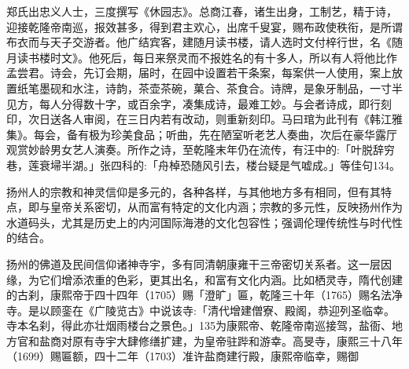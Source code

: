 \vfill
\begin{BookNotes}
\end{BookNotes}

\noindent 郑氏出忠义人士，三度撰写《休园志》。总商江春，诸生出身，工制艺，精于诗，迎接乾隆帝南巡，报效甚多，得到君主欢心，出席千叟宴，赐布政使秩衔，是所谓布衣而与天子交游者。他广结宾客，建随月读书楼，请人选时文付梓行世，名《随月读书楼时文》。他死后，每日来祭灵而不报姓名的有十多人，所以有人将他比作孟尝君。诗会，先订会期，届时，在园中设置若干条案，每案供一人使用，案上放置纸笔墨砚和水注，诗韵，茶壶茶碗，菓合、茶食合。诗牌，是象牙制品，一寸半见方，每人分得数十字，或百余字，凑集成诗，最难工妙。与会者诗成，即行刻印，次日送各人审阅，在三日内若有改动，则重新刻印。马曰琯为此刊有《韩江雅集》。每会，备有极为珍美食品；听曲，先在陋室听老艺人奏曲，次后在豪华露厅观赏妙龄男女艺人演奏。所作之诗，至乾隆末年仍在流传，有汪中的:「叶脱辞穷巷，莲衰埽半湖。」张四科的:「舟棹恐随风引去，楼台疑是气嘘成。」等佳句134。


扬州人的宗教和神灵信仰是多元的，各种各样，与其他地方多有相同，但有其特点，即与皇帝关系密切，从而富有特定的文化内涵；宗教的多元性，反映扬州作为水道码头，尤其是历史上的内河国际海港的文化包容性；强调伦理传统性与时代性的结合。

扬州的佛道及民间信仰诸神寺宇，多有同清朝康雍干三帝密切关系者。这一层因缘，为它们增添浓重的色彩，更其出名，和富有文化内涵。比如栖灵寺，隋代创建的古刹，康熙帝于四十四年（1705）赐「澄旷」匾，乾隆三十年（1765）赐名法净寺。是以顾銮在《广陵览古》中说该寺:「清代增建僧寮、殿阁，恭迎列圣临幸。寺本名刹，得此亦壮烟雨楼台之景色。」135为康熙帝、乾隆帝南巡接驾，盐衙、地方官和盐商对原有寺宇大肆修缮扩建，为皇帝驻跸和游幸。高旻寺，康熙三十八年（1699）赐匾额，四十二年（1703）准许盐商建行殿，康熙帝临幸，赐御

\vfill
\begin{BookNotes}
\end{BookNotes}

